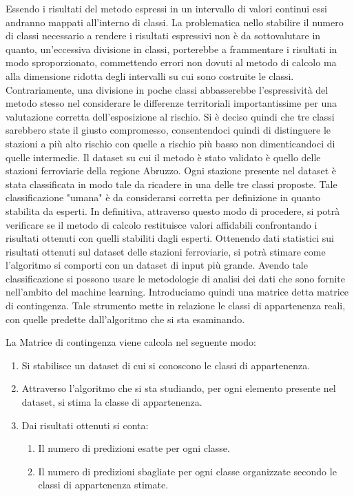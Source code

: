 Essendo i risultati del metodo espressi in un intervallo di valori continui essi andranno mappati all'interno di classi. La problematica nello stabilire il numero di classi necessario a rendere i risultati espressivi non è da sottovalutare in quanto, un'eccessiva divisione in classi, porterebbe a frammentare i risultati in modo sproporzionato, commettendo errori non dovuti al metodo di calcolo ma alla dimensione ridotta degli intervalli su cui sono costruite le classi. Contrariamente, una divisione in poche classi abbasserebbe l'espressività del metodo stesso nel considerare le differenze territoriali importantissime per una valutazione corretta dell'esposizione al rischio.
Si è deciso quindi che tre classi sarebbero state il giusto compromesso, consentendoci quindi di distinguere le stazioni a più alto rischio con quelle a rischio più basso non dimenticandoci di quelle intermedie. 
Il dataset su cui il metodo è stato validato è quello delle stazioni ferroviarie della regione Abruzzo.
Ogni stazione presente nel dataset è stata classificata in modo tale da ricadere in una delle tre classi proposte. Tale classificazione "umana" è da considerarsi corretta per definizione in quanto stabilita da esperti. In definitiva, attraverso questo modo di procedere, si potrà verificare se il metodo di calcolo restituisce valori affidabili confrontando i risultati ottenuti con quelli stabiliti dagli esperti. Ottenendo dati statistici sui risultati ottenuti sul dataset delle stazioni ferroviarie, si potrà stimare come l'algoritmo si comporti con un dataset di input più grande. 
Avendo tale classificazione si possono usare le metodologie di analisi dei dati che sono fornite nell'ambito del machine learning. Introduciamo quindi una matrice detta matrice di contingenza. Tale strumento mette in relazione le classi di appartenenza reali, con quelle predette dall'algoritmo che si sta esaminando.


La Matrice di contingenza viene calcola nel seguente modo:
\begin{enumerate}
	\item Si stabilisce un dataset di cui si conoscono le classi di appartenenza.
	\item Attraverso l'algoritmo che si sta studiando, per ogni elemento presente nel dataset, si stima la classe di appartenenza.
	\item Dai risultati ottenuti si conta:
	\begin{enumerate}
		\item Il numero di predizioni esatte per ogni classe.
		\item Il numero di predizioni sbagliate per ogni classe organizzate secondo le classi di appartenenza stimate.
	\end{enumerate}
\end{enumerate}



